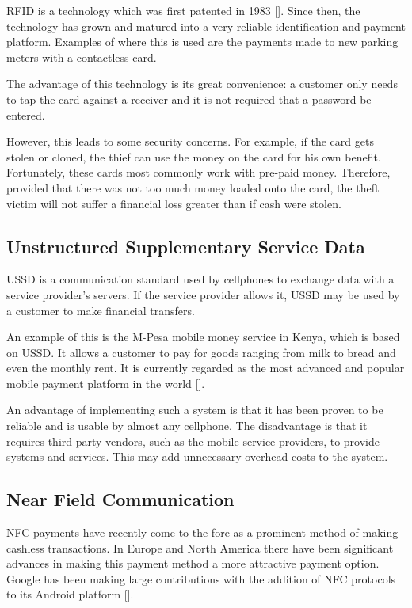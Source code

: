 RFID is a technology which was first patented in 1983
[\cite{patent:nfc-patent}]. Since then, the technology has grown and matured into a very
reliable identification and payment platform. Examples of where this is used are the
payments made to new parking meters with a contactless card.

The advantage of this technology is its great convenience: a customer only needs
to tap the card against a receiver and it is not required that a password be
entered.

However, this leads to some security concerns. For example, if the card gets stolen
or cloned, the thief can use the money on the card for his own benefit.
Fortunately, these cards most commonly work with pre-paid money.
Therefore, provided that there was not too much money loaded onto the card, the
theft victim will not suffer a financial loss greater than if cash were stolen. 

\subsection{Unstructured Supplementary Service Data}

USSD is a communication standard used by cellphones to exchange data with a
service provider's servers. If the service provider allows it, USSD may be used by a customer to make financial transfers. 

An example of this is the M-Pesa mobile money service in Kenya, which is based on USSD.
It allows a customer to pay for goods ranging from milk to bread and even the monthly
rent. It is currently regarded as the most advanced and popular mobile payment platform
in the world [\cite{journal:m-pesa}].

An advantage of implementing such a system is that it has been proven to be reliable and
is usable by almost any cellphone. The disadvantage is that it requires third party
vendors, such as the mobile service providers, to provide systems and services. This may
add unnecessary overhead costs to the system.

\subsection{Near Field Communication}

NFC payments have recently come to the fore as a
prominent method of making cashless transactions. In Europe and North
America there have been significant advances in making this payment method a
more attractive payment option. Google has been making large contributions with
the addition of NFC protocols to its Android platform
[\cite{website:android-gingerbread}].

